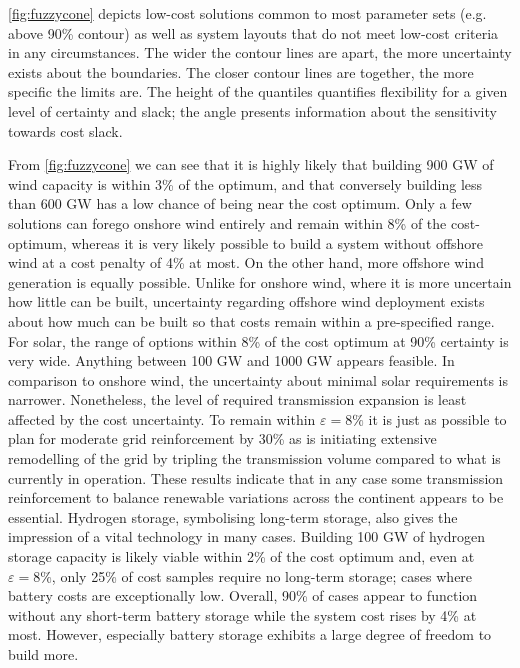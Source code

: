 \cref{fig:fuzzycone} depicts low-cost solutions common to most parameter sets (e.g. above 90\% contour)
as well as system layouts that do not meet low-cost criteria in any circumstances.
The wider the contour lines are apart, the more uncertainty exists about the boundaries.
The closer contour lines are together, the more specific the limits are.
The height of the quantiles quantifies flexibility for a given level of certainty and slack;
the angle presents information about the sensitivity towards cost slack.

From \cref{fig:fuzzycone} we can see that it is 
highly likely that building 900 GW of wind capacity is within 3\% of the optimum, and that
conversely building less than 600 GW has a low chance of being near the cost optimum.
Only a few solutions can forego onshore wind entirely and remain within 8\% of the cost-optimum,
whereas it is very likely possible to build a system without offshore wind at a cost penalty of 4\% at most.
On the other hand, more offshore wind generation is equally possible.
Unlike for onshore wind, where it is more uncertain how little can be built,
uncertainty regarding offshore wind deployment exists about how much can be built
so that costs remain within a pre-specified range.
For solar, the range of options within 8\% of the cost optimum at 90\% certainty is very wide.
Anything between 100 GW and 1000 GW appears feasible.
In comparison to onshore wind, the uncertainty about minimal solar requirements is narrower.
Nonetheless, the level of required transmission expansion is least affected by the cost uncertainty.
To remain within $\varepsilon=8\%$ it is just as possible to
plan for moderate grid reinforcement by 30\% as 
is initiating extensive remodelling of the grid by tripling the transmission volume
compared to what is currently in operation.
These results indicate that in any case some transmission reinforcement
to balance renewable variations across the continent appears to be essential.
Hydrogen storage, symbolising long-term storage, also gives the impression of a vital technology in many cases.
Building 100 GW of hydrogen storage capacity is likely viable within 2\% of the cost optimum 
and, even at $\varepsilon=8\%$, only 25\% of cost samples require no long-term storage; 
cases where battery costs are exceptionally low.
Overall, 90\% of cases appear to function without any short-term battery storage
while the system cost rises by 4\% at most.
However, especially battery storage exhibits a large degree of freedom to build more.


